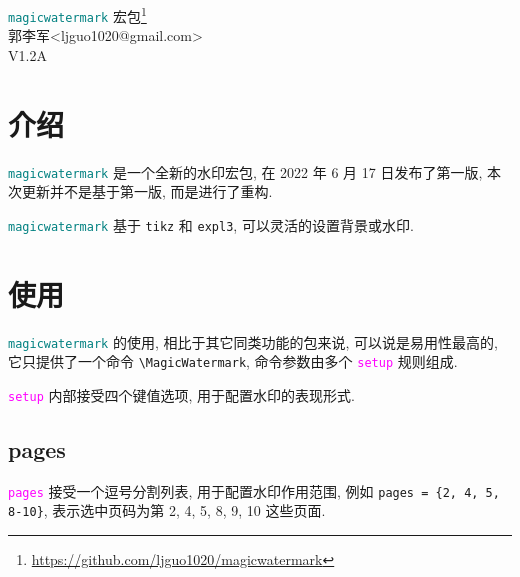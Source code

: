 \documentclass{article}
\def\pkgname{\textcolor{teal}{\texttt{magicwatermark}}}
\newcounter{example}
\def\opt#1{\textcolor{magenta}{\texttt{#1}}}
\begin{document}
\vspace*{\fill}
\begin{center}
  {\Huge \textcolor{teal}{\texttt{magicwatermark}} 宏包\footnote{\url{https://github.com/ljguo1020/magicwatermark}}} \\[.5cm]
  {\Large 郭李军<ljguo1020@gmail.com>} \\[.5cm]
  {\Large V1.2A}\\[1cm]
\begin{example}[]
\end{example}
\end{center}

\vspace*{\fill}

\newpage


\linespread{1.3}\selectfont
\tableofcontents

\section{介绍}

\pkgname{} 是一个全新的水印宏包, 在 2022 年 6 月 17 日发布了第一版, 本次更新并不是基于第一版, 而是进行了重构.

\pkgname{} 基于 \texttt{tikz} 和 \texttt{expl3}, 可以灵活的设置背景或水印.

\section{使用}
\pkgname{} 的使用, 相比于其它同类功能的包来说, 可以说是易用性最高的, 它只提供了一个命令 \verb|\MagicWatermark|, 命令参数由多个 \opt{setup} 规则组成.
\begin{example}[]
\end{example}

\opt{setup} 内部接受四个键值选项, 用于配置水印的表现形式.

\subsection{pages}
\opt{pages} 接受一个逗号分割列表, 用于配置水印作用范围, 例如 \verb|pages = {2, 4, 5, 8-10}|, 表示选中页码为第 2, 4, 5, 8, 9, 10 这些页面.
\end{document}
